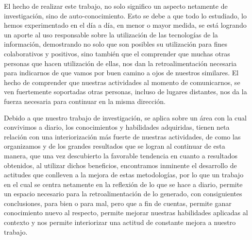 
El hecho de realizar este trabajo, no solo significo un aspecto netamente de investigación, sino de auto-conocimiento.
Esto se debe a que todo lo estudiado, lo hemos experimentado en el día a día, en menor o mayor medida, se está logrando
un aporte al uso responsable sobre la utilización de las tecnologías de la información, demostrando no solo que son posibles
su utilización para fines colaborativos y positivos, sino también que el comprender que muchas otras personas que hacen 
utilización de ellas, nos dan la retroalimentación necesaria para indicarnos de que vamos por buen camino a ojos de nuestros similares.
El hecho de comprender que nuestras actividades al momento de comunicarnos, se ven fuertemente soportadas otras personas, incluso de lugares
distantes, nos da la fuerza necesaria para continuar en la misma dirección.


Debido a que nuestro trabajo de investigación, se aplica sobre un área con la cual convivimos a diario, los conocimientos y habilidades adquiridas,
tienen neta relación con una interiorización más fuerte de nuestras actividades, de como las organizamos y de los grandes resultados que se logran
al continuar de esta manera, que una vez descubierto la favorable tendencia en cuanto a resultados obtenidos, al utilizar dichos beneficios, encontramos
inminente el desarrollo de actitudes que conlleven a la mejora de estas metodologías, por lo que un trabajo en el cual se centra netamente en la reflexión
de lo que se hace a diario, permite un espacio necesario para la retroalimentación de lo generado, con consiguientes conclusiones, para bien o para mal, pero 
que a fin de cuentas, permite ganar conocimiento nuevo al respecto, permite mejorar nuestras habilidades aplicadas al contexto y nos permite interiorizar
una actitud de constante mejora a nuestro trabajo.


